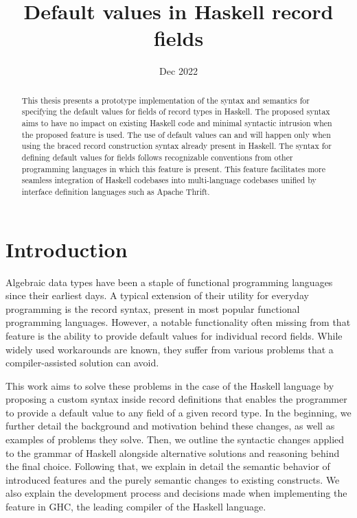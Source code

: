 \documentclass[en]{pracamgr}
\title{Default values in Haskell record fields}
\date{Dec 2022}
\begin{document}
\maketitle

\begin{abstract}
  This thesis presents a prototype implementation of the syntax
  and semantics for specifying the default values for fields 
  of record types in Haskell. The proposed syntax aims to have
  no impact on existing Haskell code and minimal syntactic intrusion
  when the proposed feature is used. The use of default values
  can and will happen only when using the braced record construction
  syntax already present in Haskell. The syntax for defining default 
  values for fields follows recognizable conventions from other
  programming languages in which this feature is present.
  This feature facilitates more seamless integration of Haskell codebases 
  into multi-language codebases unified
  by interface definition languages such as Apache Thrift. 
\end{abstract}

\tableofcontents

\chapter*{Introduction}

Algebraic data types have been a staple of functional programming languages since their earliest days.
A typical extension of their utility for everyday programming is the record syntax, present in most popular functional programming languages.
However, a notable functionality often missing from that feature is the ability to provide default values for individual record fields.
While widely used workarounds are known, they suffer from various problems that a compiler-assisted solution can avoid.

This work aims to solve these problems in the case of the Haskell language \cite{HudakHaskell}
by proposing a custom syntax inside record definitions that enables the programmer to provide a default value to any field of a given record type.
In the beginning, we further detail the background and motivation behind these changes, as well as examples of problems they solve.
Then, we outline the syntactic changes applied to the grammar of Haskell alongside alternative solutions and reasoning behind the final choice.
Following that, we explain in detail the semantic behavior of introduced features and the purely semantic changes to existing constructs.
We also explain the development process and decisions made when implementing the feature in GHC, the leading compiler of the Haskell language.
\end{document}
